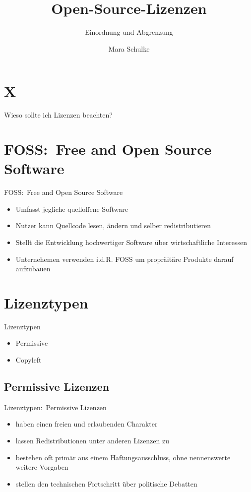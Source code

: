 \documentclass{beamer}
\title{Open-Source-Lizenzen}
\subtitle{Einordnung und Abgrenzung}
\author{Mara Schulke}
\begin{document}
\maketitle

\section{X}
\begin{frame}{Wieso sollte ich Lizenzen beachten?}
\end{frame}

\section{FOSS:\ Free and Open Source Software}
\begin{frame}{FOSS:\ Free and Open Source Software}
	\begin{itemize}
		\item Umfasst jegliche quelloffene Software
		\item Nutzer kann Quellcode lesen, ändern und selber redistributieren
		\item Stellt die Entwicklung hochwertiger Software über wirtschaftliche
			Interessen
		\item Unternehemen verwenden i.d.R. FOSS um propräitäre Produkte darauf
			aufzubauen
	\end{itemize}
\end{frame}

\section{Lizenztypen}
\begin{frame}{Lizenztypen}
	\begin{itemize}
		\item Permissive
		\item Copyleft
	\end{itemize}
\end{frame}

\subsection{Permissive Lizenzen}
\begin{frame}{Lizenztypen:\ Permissive Lizenzen}
	\begin{itemize}
		\item haben einen freien und erlaubenden Charakter
		\item lassen Redistributionen unter anderen Lizenzen zu
		\item bestehen oft primär aus einem Haftungsausschluss, ohne
			nennenswerte weitere Vorgaben
		\item stellen den technischen Fortschritt über politische Debatten
	\end{itemize}
\end{frame}
\end{document}
